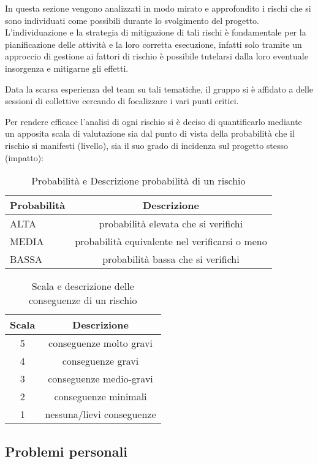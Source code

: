 In questa sezione vengono analizzati in modo mirato e approfondito i rischi che si sono individuati come possibili durante lo svolgimento del progetto. L'individuazione e la strategia di mitigazione di tali rischi è fondamentale per la pianificazione delle attività e la loro corretta esecuzione, infatti solo tramite un approccio di gestione ai fattori di rischio è possibile tutelarsi dalla loro eventuale insorgenza e mitigarne gli effetti.

Data la scarsa esperienza del team su tali tematiche, il gruppo si è affidato a delle sessioni di \underline{} collettive cercando di focalizzare i vari punti critici.

Per rendere efficace l'analisi di ogni rischio si è deciso di quantificarlo mediante un apposita scala di valutazione sia dal punto di vista della probabilità che il rischio si manifesti (livello), sia il suo grado di incidenza sul progetto stesso (impatto):

\begin{table}[h!]
\centering
\begin{tabular}{|l|c|}
\hline
Probabilità& Descrizione\\
\hline
ALTA & probabilità elevata che si verifichi\\
MEDIA & probabilità equivalente nel verificarsi o meno\\
BASSA & probabilità bassa che si verifichi\\
\hline
\end{tabular}
\caption{Probabilità e Descrizione probabilità di un rischio}\label{tab:livellorischi}
\end{table}
\begin{table}[h!]
\centering
\begin{tabular}{|c|c|}
\hline
Scala& Descrizione  \\
\hline
5 & conseguenze molto gravi\\
4 & conseguenze gravi\\
3 & conseguenze medio-gravi\\
2 & conseguenze minimali\\
1 & nessuna/lievi conseguenze\\
\hline
\end{tabular}
\caption{Scala e descrizione delle conseguenze di un rischio}\label{tab:impattorischi}
\end{table}

\subsection{Problemi personali}

